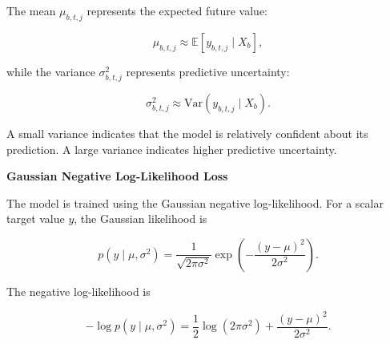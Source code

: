 \documentclass{book}
\providecommand{\ProjectDeepHeading}[2]{%
    \par\medskip\noindent\textbf{#2}\par\smallskip
}
\begin{document}
        The mean \(\ensuremath{\mu}_{b,t,j}\) represents the expected future value:
        
        \[
            \ensuremath{\mu}_{b,t,j}
            \approx
            \mathbb{E}
            \left[
                y_{b,t,j}
                \mid
                X_b
            \right],
        \]
        
        while the variance \(\ensuremath{\sigma}^2_{b,t,j}\) represents predictive uncertainty:
        
        \[
            \ensuremath{\sigma}^2_{b,t,j}
            \approx
            \mathrm{Var}
            \left(
                y_{b,t,j}
                \mid
                X_b
            \right).
        \]
        
        A small variance indicates that the model is relatively confident about its prediction. A large variance indicates higher predictive uncertainty.
    
    
    \ProjectDeepHeading{8}{Gaussian Negative Log-Likelihood Loss}
        
        The model is trained using the Gaussian negative log-likelihood. For a scalar target value \(y\), the Gaussian likelihood is
        
        \[
            p
            \left(
                y
                \mid
                \ensuremath{\mu},
                \ensuremath{\sigma}^2
            \right)
            =
            \frac{
                1
            }{
                \sqrt{
                    2\ensuremath{\pi}\ensuremath{\sigma}^2
                }
            }
            \exp
            \left(
                -
                \frac{
                    \left(
                        y
                        -
                        \ensuremath{\mu}
                    \right)^2
                }{
                    2\ensuremath{\sigma}^2
                }
            \right).
        \]
        
        The negative log-likelihood is
        
        \[
            -
            \log
            p
            \left(
                y
                \mid
                \ensuremath{\mu},
                \ensuremath{\sigma}^2
            \right)
            =
            \frac{1}{2}
            \log
            \left(
                2\ensuremath{\pi}\ensuremath{\sigma}^2
            \right)
            +
            \frac{
                \left(
                    y
                    -
                    \ensuremath{\mu}
                \right)^2
            }{
                2\ensuremath{\sigma}^2
            }.
        \]
        
\end{document}
